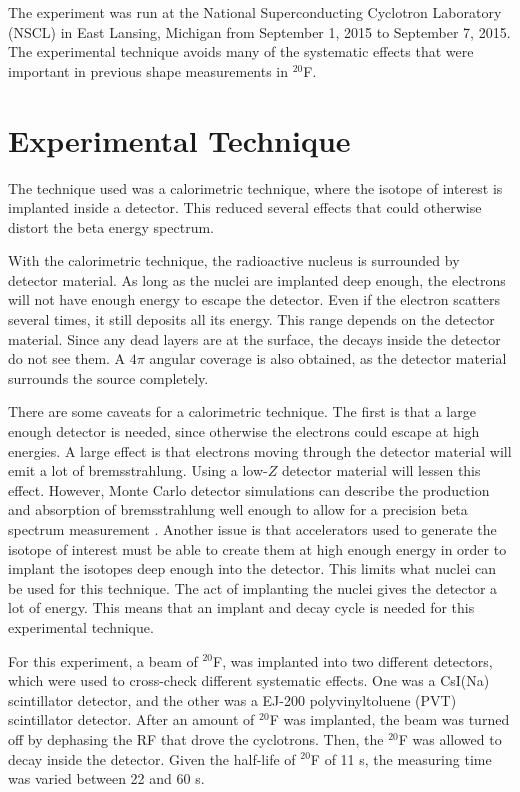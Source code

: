 \documentclass[../MaxHughesThesis.tex]{subfiles}
\begin{document}
The experiment was run at the National Superconducting Cyclotron Laboratory (NSCL) in East Lansing, Michigan from September 1, 2015 to September 7, 2015.
The experimental technique avoids many of the systematic effects that were important in previous shape measurements in  $^{20}$F.

\section{Experimental Technique}
The technique used was a calorimetric technique, where the isotope of interest is implanted inside a detector.
This reduced several effects that could otherwise distort the beta energy spectrum.

With the calorimetric technique, the radioactive nucleus is surrounded by detector material.
As long as the nuclei are implanted deep enough, the electrons will not have enough energy to escape the detector.
Even if the electron scatters several times, it still deposits all its energy.
This range depends on the detector material.
Since any dead layers are at the surface, the decays inside the detector do not see them.
A $4\pi$ angular coverage is also obtained, as the detector material surrounds the source completely.

There are some caveats for a calorimetric technique. 
The first is that a large enough detector is needed, since otherwise the electrons could escape at high energies.
A large effect is that electrons moving through the detector material will emit a lot of bremsstrahlung.
Using a low-$Z$ detector material will lessen this effect.
However, Monte Carlo detector simulations can describe the production and absorption of bremsstrahlung well enough to allow for a precision beta spectrum measurement \cite{Huy18}. 
Another issue is that accelerators used to generate the isotope of interest must be able to create them at high enough energy in order to implant the isotopes deep enough into the detector.
This limits what nuclei can be used for this technique.
The act of implanting the nuclei gives the detector a lot of energy. 
This means that an implant and decay cycle is needed for this experimental technique.

For this experiment, a  beam of  $^{20}$F, was implanted into two different detectors, which were used to cross-check different systematic effects.
One was a CsI(Na) scintillator detector, and the other was a  EJ-200 polyvinyltoluene (PVT) scintillator detector. 
After an amount of $^{20}$F was implanted, the beam was turned off by dephasing the RF that drove the cyclotrons.
Then, the $^{20}$F was allowed to decay inside the detector. 
Given the half-life of $^{20}$F of 11 s, the measuring time was varied between 22 and 60 s.
\end{document}
